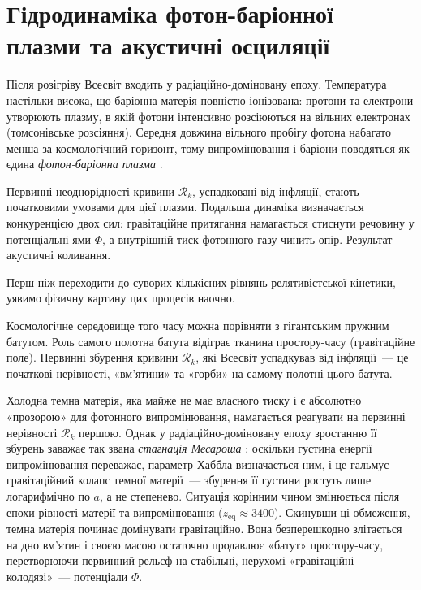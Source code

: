 
\chapter{Гідродинаміка фотон-баріонної плазми та акустичні осциляції}
\label{sec:bao}

Після розігріву Всесвіт входить у радіаційно-доміновану епоху.
Температура настільки висока, що баріонна матерія повністю
іонізована: протони та електрони утворюють плазму, в якій
фотони інтенсивно розсіюються на вільних електронах
(томсонівське розсіяння). Середня довжина вільного пробігу
фотона набагато менша за космологічний горизонт, тому
випромінювання і баріони поводяться як єдина
\emph{фотон-баріонна плазма} \cite{mukhanov_2005}.

Первинні неоднорідності кривини $\mathcal{R}_k$, успадковані
від інфляції, стають початковими умовами для цієї плазми.
Подальша динаміка визначається конкуренцією двох сил:
гравітаційне притягання намагається стиснути речовину у
потенціальні ями $\Phi$, а внутрішній тиск фотонного газу
чинить опір. Результат~--- акустичні коливання.

Перш ніж переходити до суворих кількісних рівнянь релятивістської
кінетики, уявимо фізичну картину цих процесів наочно.

Космологічне середовище того часу можна порівняти з гігантським
пружним батутом. Роль самого полотна батута відіграє тканина
простору-часу (гравітаційне поле). Первинні збурення кривини
$\mathcal{R}_k$, які Всесвіт успадкував від інфляції~--- це початкові
нерівності, «вм'ятини» та «горби» на самому полотні цього батута.

Холодна темна матерія, яка майже не має власного тиску і є абсолютно
«прозорою» для фотонного випромінювання, намагається реагувати на
первинні нерівності $\mathcal{R}_k$ першою.
Однак у радіаційно-доміновану епоху зростанню її збурень заважає
так звана \emph{стагнація Месароша} \cite{Meszaros1974}: оскільки
густина енергії випромінювання переважає, параметр Хаббла
визначається ним, і це гальмує гравітаційний колапс темної
матерії~--- збурення її густини ростуть лише логарифмічно по $a$,
а не степенево.
Ситуація корінним чином змінюється після епохи рівності матерії та
випромінювання ($z_{\text{eq}} \approx 3400$). Скинувши ці обмеження,
темна матерія починає домінувати гравітаційно. Вона безперешкодно
злітається на дно вм'ятин і своєю масою остаточно продавлює
«батут» простору-часу, перетворюючи первинний рельєф на стабільні,
нерухомі «гравітаційні колодязі»~--- потенціали $\Phi$.

